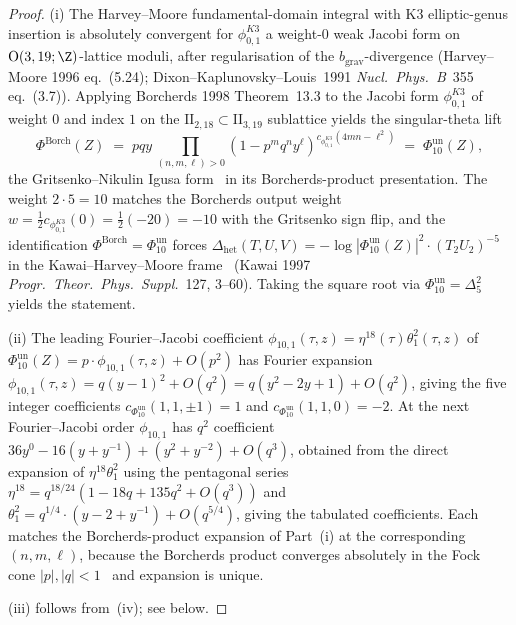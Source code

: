 \begin{proof}
\textup{(i)} The Harvey--Moore fundamental-domain integral with K3
elliptic-genus insertion is absolutely convergent for $\phi_{0,1}^{K3}$
a weight-$0$ weak Jacobi form on $\mathrm{O}(3,19;\Z)$-lattice moduli,
after regularisation of the $b_{\mathrm{grav}}$-divergence (Harvey--Moore
1996 eq.~(5.24); Dixon--Kaplunovsky--Louis~1991
\emph{Nucl.~Phys.~B}~355 eq.~(3.7)). Applying Borcherds 1998
Theorem~13.3 to the Jacobi form
$\phi_{0,1}^{K3}$ of weight $0$ and index $1$ on the
$\mathrm{II}_{2,18}\subset\mathrm{II}_{3,19}$ sublattice yields the
singular-theta lift
\[
\Phi^{\mathrm{Borch}}(Z)
\;=\;
p q y\,
\prod_{(n, m, \ell) > 0}
(1 - p^m q^n y^\ell)^{c_{\phi_{0,1}^{K3}}(4 m n - \ell^2)}
\;=\;
\Phi_{10}^{\mathrm{un}}(Z),
\]
the Gritsenko--Nikulin Igusa form~\cite[Theorem~2.1]{GritsenkoNikulin1998}
in its Borcherds-product presentation. The weight $2\cdot 5 = 10$
matches the Borcherds output weight
$w = \tfrac{1}{2}c_{\phi_{0,1}^{K3}}(0) = \tfrac{1}{2}(-20) = -10$
with the Gritsenko sign flip, and the identification
$\Phi^{\mathrm{Borch}} = \Phi_{10}^{\mathrm{un}}$ forces
$\Delta_{\mathrm{het}}(T, U, V)
= -\log|\Phi_{10}^{\mathrm{un}}(Z)|^2\cdot(T_2 U_2)^{-5}$
in the Kawai--Harvey--Moore
frame~\cite{HarveyMoore1996} (Kawai 1997
\emph{Progr.\ Theor.\ Phys.\ Suppl.}~127, 3--60). Taking the square root
via $\Phi_{10}^{\mathrm{un}} = \Delta_5^2$ yields the statement.

\textup{(ii)} The leading Fourier--Jacobi coefficient
$\phi_{10,1}(\tau, z) = \eta^{18}(\tau)\theta_1^2(\tau, z)$ of
$\Phi_{10}^{\mathrm{un}}(Z) = p\cdot\phi_{10,1}(\tau, z) + O(p^2)$ has
Fourier expansion
$\phi_{10,1}(\tau, z) = q(y - 1)^2 + O(q^2) = q(y^2 - 2y + 1) + O(q^2)$,
giving the five integer coefficients
$c_{\Phi_{10}^{\mathrm{un}}}(1, 1, \pm 1) = 1$
and $c_{\Phi_{10}^{\mathrm{un}}}(1, 1, 0) = -2$. At the next Fourier--Jacobi order
$\phi_{10,1}$ has $q^2$ coefficient
$36 y^0 - 16(y + y^{-1}) + (y^2 + y^{-2}) + O(q^3)$, obtained from the
direct expansion of $\eta^{18}\theta_1^2$ using the pentagonal series
$\eta^{18} = q^{18/24}(1 - 18 q + 135 q^2 + O(q^3))$ and
$\theta_1^2 = q^{1/4}\cdot(y - 2 + y^{-1}) + O(q^{5/4})$, giving
the tabulated coefficients. Each matches the Borcherds-product
expansion of Part~\textup{(i)} at the corresponding $(n, m, \ell)$,
because the Borcherds product converges absolutely in the Fock cone
$|p|, |q| < 1$~\cite[\S 10]{Borcherds1998} and expansion is unique.

\textup{(iii)} follows from~\textup{(iv)}; see below.


\end{proof}
